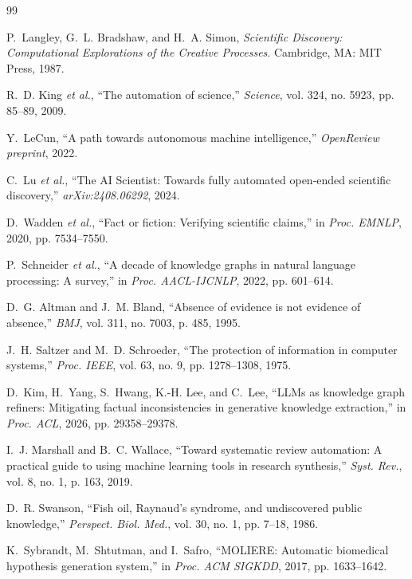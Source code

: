 \documentclass[conference,10pt]{IEEEtran}
\begin{document}
\begin{thebibliography}{99}

P.~Langley, G.~L. Bradshaw, and H.~A. Simon, \emph{Scientific Discovery: Computational Explorations of the Creative Processes}. Cambridge, MA: MIT Press, 1987.

R.~D. King \emph{et al.}, ``The automation of science,'' \emph{Science}, vol. 324, no. 5923, pp. 85--89, 2009.

Y.~LeCun, ``A path towards autonomous machine intelligence,'' \emph{OpenReview preprint}, 2022.

C.~Lu \emph{et al.}, ``The AI Scientist: Towards fully automated open-ended scientific discovery,'' \emph{arXiv:2408.06292}, 2024.

D.~Wadden \emph{et al.}, ``Fact or fiction: Verifying scientific claims,'' in \emph{Proc. EMNLP}, 2020, pp. 7534--7550.

P.~Schneider \emph{et al.}, ``A decade of knowledge graphs in natural language processing: A survey,'' in \emph{Proc. AACL-IJCNLP}, 2022, pp. 601--614.

D.~G. Altman and J.~M. Bland, ``Absence of evidence is not evidence of absence,'' \emph{BMJ}, vol. 311, no. 7003, p. 485, 1995.

J.~H. Saltzer and M.~D. Schroeder, ``The protection of information in computer systems,'' \emph{Proc. IEEE}, vol. 63, no. 9, pp. 1278--1308, 1975.

D.~Kim, H.~Yang, S.~Hwang, K.-H. Lee, and C.~Lee, ``LLMs as knowledge graph refiners: Mitigating factual inconsistencies in generative knowledge extraction,'' in \emph{Proc. ACL}, 2026, pp. 29358--29378.

I.~J. Marshall and B.~C. Wallace, ``Toward systematic review automation: A practical guide to using machine learning tools in research synthesis,'' \emph{Syst. Rev.}, vol. 8, no. 1, p. 163, 2019.

D.~R. Swanson, ``Fish oil, Raynaud's syndrome, and undiscovered public knowledge,'' \emph{Perspect. Biol. Med.}, vol. 30, no. 1, pp. 7--18, 1986.

K.~Sybrandt, M.~Shtutman, and I.~Safro, ``MOLIERE: Automatic biomedical hypothesis generation system,'' in \emph{Proc. ACM SIGKDD}, 2017, pp. 1633--1642.


\end{thebibliography}
\end{document}
